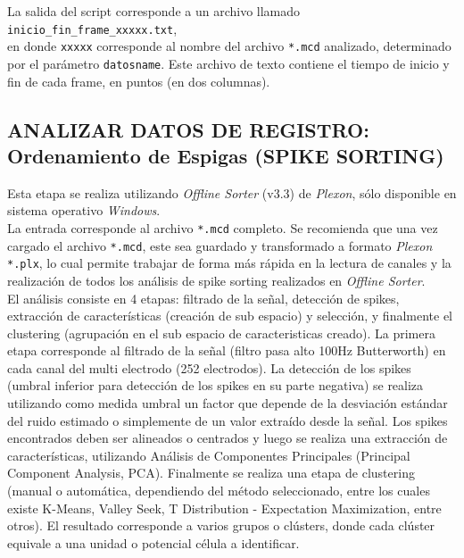 \documentclass[10pt]{article}
\begin{document}
La salida del script corresponde a un archivo llamado  \\

\verb+inicio_fin_frame_xxxxx.txt+, \\

en donde \verb+xxxxx+ corresponde al nombre del archivo \verb+*.mcd+ analizado, determinado por el parámetro \verb+datosname+. Este archivo de texto contiene el tiempo de inicio y fin de cada frame, en puntos (en dos columnas). \\

\newpage

\subsection{ ANALIZAR DATOS DE REGISTRO: Ordenamiento de Espigas (SPIKE SORTING) }

Esta etapa se realiza utilizando \textit{Offline Sorter} (v3.3) de \textit{Plexon}, sólo disponible en sistema operativo \textit{Windows}. \\

La entrada corresponde al archivo \verb+*.mcd+ completo. Se recomienda que una vez cargado el archivo \verb+*.mcd+, este sea guardado y transformado a formato \textit{Plexon} \verb+*.plx+, lo cual permite trabajar de forma más rápida en la lectura de canales y la realización de todos los análisis de spike sorting realizados en \textit{Offline Sorter}.\\

El análisis consiste en 4 etapas: filtrado de la señal, detección de spikes, extracción de características (creación de sub espacio) y selección, y finalmente el clustering (agrupación en el sub espacio de caracteristicas creado). La primera etapa corresponde al filtrado de la señal (filtro pasa alto 100Hz Butterworth) en cada canal del multi electrodo (252 electrodos). La detección de los spikes (umbral inferior para detección de los spikes en su parte negativa) se realiza utilizando como medida umbral un factor que depende de la desviación estándar del ruido estimado o simplemente de un valor extraído desde la señal. Los spikes encontrados deben ser alineados o centrados y luego se realiza una extracción de características, utilizando Análisis de Componentes Principales (Principal Component Analysis, PCA). Finalmente se realiza una etapa de clustering (manual o automática, dependiendo del método seleccionado, entre los cuales existe K-Means, Valley Seek, T Distribution - Expectation Maximization, entre otros). El resultado corresponde a varios grupos o clústers, donde cada clúster equivale a una unidad o potencial célula a identificar. \\
\end{document}
